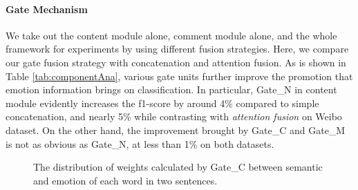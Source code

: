 \documentclass[conference]{IEEEtran}
\begin{document}
	\paragraph{Gate Mechanism}We take out the content module alone, comment module alone, and the whole framework for experiments by using different fusion strategies. Here, we compare our gate fusion strategy with concatenation and attention fusion. As is shown in Table \ref{tab:componentAna}, various gate units further improve the promotion that emotion information brings on classification. In particular, Gate\_N in content module evidently increases the f1-score by around 4\% compared to simple concatenation, and nearly 5\% while contrasting with {\em attention fusion} on Weibo dataset. On the other hand, the improvement brought by Gate\_C and Gate\_M is not as obvious as Gate\_N, at less than 1\% on both datasets.
	\begin{figure}[h]
		\centering
		\begin{minipage}[t]{0.45\textwidth}
		\end{minipage}
		\begin{minipage}[t]{0.45\textwidth}
		\end{minipage}
		\caption{The distribution of weights calculated by Gate\_C between semantic and emotion of each word in two sentences.}
		\label{Fig:case1}
	\end{figure}
	
\end{document}
